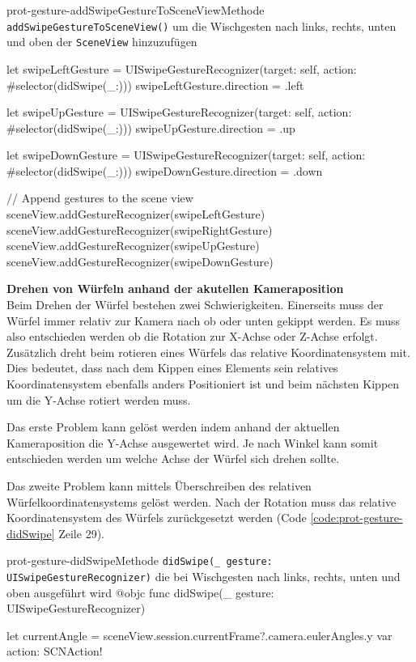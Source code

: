 \begin{description}
\begin{code}{prot-gesture-addSwipeGestureToSceneView}{Methode \texttt{addSwipeGestureToSceneView()} um die Wischgesten nach links, rechts, unten und oben der \texttt{SceneView} hinzuzufügen}
{            let swipeLeftGesture = UISwipeGestureRecognizer(target: self, action: #selector(didSwipe(_:)))
            swipeLeftGesture.direction = .left
            
            let swipeUpGesture = UISwipeGestureRecognizer(target: self, action: #selector(didSwipe(_:)))
            swipeUpGesture.direction = .up
            
            let swipeDownGesture = UISwipeGestureRecognizer(target: self, action: #selector(didSwipe(_:)))
            swipeDownGesture.direction = .down
            
            // Append gestures to the scene view
            sceneView.addGestureRecognizer(swipeLeftGesture)
            sceneView.addGestureRecognizer(swipeRightGesture)
            sceneView.addGestureRecognizer(swipeUpGesture)
            sceneView.addGestureRecognizer(swipeDownGesture)
        }
    \end{code}

    \textbf{Drehen von Würfeln anhand der akutellen Kameraposition}\\
    Beim Drehen der Würfel bestehen zwei Schwierigkeiten. Einerseits muss der Würfel immer relativ zur Kamera nach ob oder unten gekippt werden. Es muss also entschieden werden ob die Rotation zur X-Achse oder Z-Achse erfolgt. Zusätzlich dreht beim rotieren eines Würfels das relative Koordinatensystem mit. Dies bedeutet, dass nach dem Kippen eines Elements sein relatives Koordinatensystem ebenfalls anders Positioniert ist und beim nächsten Kippen um die Y-Achse rotiert werden muss. 

    Das erste Problem kann gelöst werden indem anhand der aktuellen Kameraposition die Y-Achse ausgewertet wird. Je nach Winkel kann somit entschieden werden um welche Achse der Würfel sich drehen sollte. %

    Das zweite Problem kann mittels Überschreiben des relativen Würfelkoordinatensystems gelöst werden. Nach der Rotation muss das relative Koordinatensystem des Würfels zurückgesetzt werden (Code \ref{code:prot-gesture-didSwipe} Zeile 29).

    \begin{code}{prot-gesture-didSwipe}{Methode \texttt{didSwipe(\_ gesture: UISwipeGestureRecognizer)} die bei Wischgesten nach links, rechts, unten und oben ausgeführt wird}
    @objc
    func didSwipe(_ gesture: UISwipeGestureRecognizer) {
        let currentAngle = sceneView.session.currentFrame?.camera.eulerAngles.y
        var action: SCNAction!
        
}
\end{code}
\end{description}
